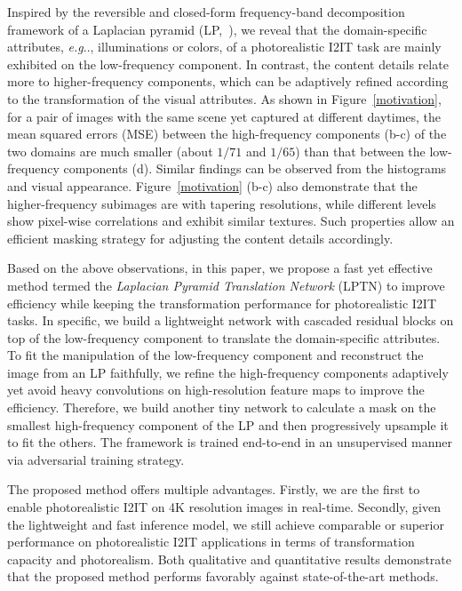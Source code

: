 \documentclass[10pt,twocolumn,letterpaper]{article}
\makeatletter
\DeclareRobustCommand\onedot{\futurelet\@let@token\@onedot}
\def\@onedot{\ifx\@let@token.\else.\null\fi\xspace}
\def\eg{\emph{e.g}\onedot} \def\Eg{\emph{E.g}\onedot}
\makeatother
\begin{document}
	Inspired by the reversible and closed-form frequency-band decomposition framework of a Laplacian pyramid (LP,~\cite{burt1983laplacian}), we reveal that the domain-specific attributes, \eg, illuminations or colors, of a photorealistic I2IT task are mainly exhibited on the low-frequency component. In contrast, the content details relate more to higher-frequency components, which can be adaptively refined according to the transformation of the visual attributes. As shown in Figure~\ref{motivation}, for a pair of images with the same scene yet captured at different daytimes, the mean squared errors (MSE) between the high-frequency components (b-c) of the two domains are much smaller (about $1/71$ and $1/65$) than that between the low-frequency components (d). Similar findings can be observed from the histograms and visual appearance. Figure~\ref{motivation} (b-c) also demonstrate that the higher-frequency subimages are with tapering resolutions, while different levels show pixel-wise correlations and exhibit similar textures. Such properties allow an efficient masking strategy for adjusting the content details accordingly.
	
	Based on the above observations, in this paper, we propose a fast yet effective method termed the \textit{Laplacian Pyramid Translation Network} (LPTN) to improve efficiency while keeping the transformation performance for photorealistic I2IT tasks. In specific, we build a lightweight network with cascaded residual blocks on top of the low-frequency component to translate the domain-specific attributes. To fit the manipulation of the low-frequency component and reconstruct the image from an LP faithfully, we refine the high-frequency components adaptively yet avoid heavy convolutions on high-resolution feature maps to improve the efficiency. Therefore, we build another tiny network to calculate a mask on the smallest high-frequency component of the LP and then progressively upsample it to fit the others. The framework is trained end-to-end in an unsupervised manner via adversarial training strategy.
	
	The proposed method offers multiple advantages. Firstly, we are the first to enable photorealistic I2IT on 4K resolution images in real-time. Secondly, given the lightweight and fast inference model, we still achieve comparable or superior performance on photorealistic I2IT applications in terms of transformation capacity and photorealism. Both qualitative and quantitative results demonstrate that the proposed method performs favorably against state-of-the-art methods.
	
\end{document}
